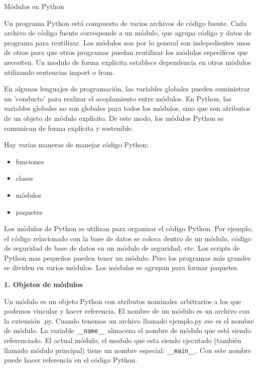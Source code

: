 \documentclass[twoside,10.5pt]{article}%
\begin{document}
\begin{center}
{\LARGE{M\'odulos en Python}}\\[20pt]
\end{center}

\vspace{0.3cm}

Un programa Python est\'a compuesto de varios archivos de c\'odigo fuente. Cada archivo de c\'odigo fuente corresponde a un m\'odulo, que agrupa c\'odigo y datos de programa para reutilizar. Los m\'odulos son por lo general son indepedientes unos de otros para que otros programas puedan reutilizar los m\'odulos espec\'ificos que necesiten. Un modulo de forma explicita establece dependencia en otros m\'odulos utilizando sentencias {\color{red} import} o {\color{red} from}.

En algunos lenguajes de programaci\'on, las variables globales pueden suministrar un 'conducto' para realizar el acoplamiento entre m\'odulos. En Python, las variables globales no son globales para todos los m\'odulos, sino que son atributos de un objeto de m\'odulo expl\'icito. De este modo, los m\'odulos Python se comunican de forma expl\'icita y sostenible.

Hay varias maneras de manejar c\'odigo Python:

\begin{itemize}
\item funciones
\item clases
\item m\'odulos
\item paquetes
\end{itemize} 

Los m\'odulos de Python se utilizan para organizar el c\'odigo Python. Por ejemplo, el c\'odigo relacionado con la base de datos se coloca dentro de un m\'odulo, c\'odigo de seguridad de base de datos en un módulo de seguridad, etc. Los scripts de Python mas peque\~nos pueden tener un m\'odulo. Pero los programas m\'as grandes se dividen en varios m\'odulos. Los m\'odulos se agrupan para formar paquetes.

\vspace{0.3cm}

\textbf{1. Objetos de m\'odulos}

\vspace{0.3cm}

Un m\'odulo es un objeto Python con atributos nominales arbitrarios a los que podemos vincular y hacer referencia. El nombre de un m\'odulo es un archivo con la extensi\'on .py. Cuando tenemos un archivo llamado ejemplo.py ese es el nombre de m\'odulo. La variable \texttt{\_\_name\_\_} almacena el nombre de m\'odulo que est\'a siendo referenciado. El actual m\'odulo, el modulo que esta siendo ejecutado (tambi\'en llamado m\'odulo principal) tiene un nombre especial: \texttt{\_\_main\_\_}. Con este nombre puede hacer referencia en el c\'odigo Python.
\end{document}
